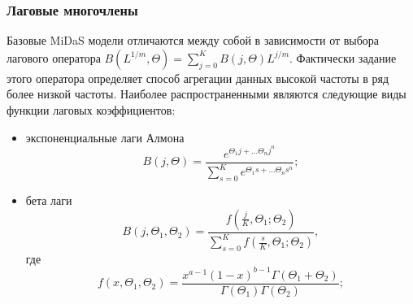 \documentclass[notheorems]{beamer}
\begin{document}
\begin{frame}
	\frametitle{Лаговые многочлены}
	Базовые MiDaS модели отличаются между собой в зависимости от выбора лагового оператора $B(L^{1/m}, \Theta) = \sum\limits_{j=0}^{K} B(j, \Theta) L^{j/m}.$ Фактически задание этого оператора определяет
	способ агрегации данных высокой частоты в ряд более низкой частоты.
	Наиболее распространенными являются следующие виды функции лаговых коэффициентов:
	\begin{itemize}
		\item экспоненциальные лаги Алмона
		$$B(j, \Theta) = \dfrac{e^{\Theta_1 j + \ldots \Theta_n j^n}}{\sum_{s=0}^{K}e^{\Theta_1 s + \ldots \Theta_n s^n}};$$
		\item бета лаги
		$$B(j, \Theta_1, \Theta_2) = \dfrac{f(\frac j K, \Theta_1;\Theta_2)}{\sum_{s=0}^{K}f(\frac s K, \Theta_1;\Theta_2)},$$
		где $$f(x, \Theta_1, \Theta_2) = \dfrac{x^{a-1}(1-x)^{b-1}\Gamma(\Theta_1 + \Theta_2)}{\Gamma(\Theta_1)\Gamma(\Theta_2)};$$
	\end{itemize}
\end{frame}

\end{document}
